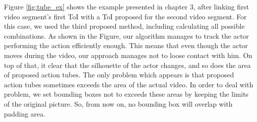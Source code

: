 Figure \ref{fig:tube_ex} shows the example presented in chapter 3, after linking first video segment's first ToI with a ToI proposed for the second video segment. For this case, we used the third proposed method, including calculating all possible combinations. As shown in the Figure,
our algorithm manages to track the actor performing the action efficiently enough. This means that even though the actor moves during the
video, our approach manages not to loose contact with him. On top of that, it clear that the silhouette of the actor changes, and so does the area of proposed action tubes. The only problem which appears is that proposed action tubes sometimes exceeds the area of the actual video.
In order to deal with problem, we set bounding boxes not to exceeds these areas by keeping the limits of the original picture. So,
from now on, no bounding box will overlap with padding area.
% 
